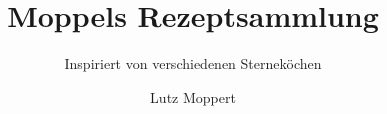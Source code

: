 \documentclass[fontsize=11pt, paper=a4, toc=index, DIV=12, BCOR=10mm]{scrbook}
\begin{document}
%
%
\subject{\textcolor{Mahogany}{Gute Küche ganz einfach}}
\title{\textcolor{Mahogany}{Moppels Rezeptsammlung}}
\subtitle{\textcolor{Mahogany}{Inspiriert von verschiedenen Sterneköchen}}
\author{\textcolor{Mahogany}{Lutz Moppert}}
\date{}
\dedication{Gewidmet meiner geliebten Frau Uta und unseren fröhlichen Kindern
  Line und Tim, die alle Rezepte probiert und manchmal gelitten, es jedoch
  meist genossen haben.}
\maketitle
\newpage
\tableofcontents
%
%
\end{document}
